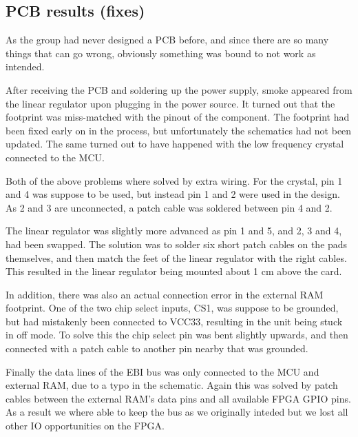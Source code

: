 
\subsection{PCB results (fixes)}

As the group had never designed a PCB before, and since there are so many things
that can go wrong, obviously something was bound to not work as intended.

After receiving the PCB and soldering up the power supply, smoke appeared from
the linear regulator upon plugging in the power source. It turned out that the
footprint was miss-matched with the pinout of the component. The footprint had
been fixed early on in the process, but unfortunately the schematics had not
been updated. The same turned out to have happened with the low frequency
crystal connected to the MCU.

Both of the above problems where solved by extra wiring. For the crystal, pin 1
and 4 was suppose to be used, but instead pin 1 and 2 were used in the design.
As 2 and 3 are unconnected, a patch cable was soldered between pin 4 and 2.

The linear regulator was slightly more advanced as pin 1 and 5, and 2, 3 and 4,
had been swapped. The solution was to solder six short patch cables on the pads
themselves, and then match the feet of the linear regulator with the right
cables. This resulted in the linear regulator being mounted about 1 cm above the
card. 

In addition, there was also an actual connection error in the external RAM
footprint. One of the two chip select inputs, CS1, was suppose to be grounded,
but had mistakenly been connected to VCC33, resulting in the unit being stuck in
off mode. To solve this the chip select pin was bent slightly upwards, and then
connected with a patch cable to another pin nearby that was grounded.

Finally the data lines of the EBI bus was only connected to the MCU and external
RAM, due to a typo in the schematic. Again this was solved by patch cables
between the external RAM's data pins and all available FPGA GPIO pins. As a
result we where able to keep the bus as we originally inteded  but we lost all other IO
opportunities on the FPGA. 
